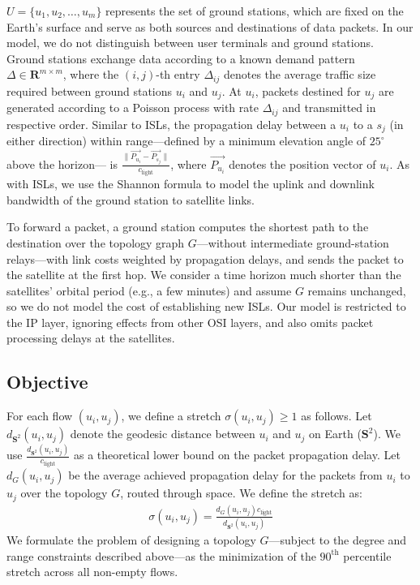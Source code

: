 \documentclass[acmsmall, screen]{acmart}
\begin{document}
$U = \{ u_1, u_2, \ldots, u_{m} \}$ represents the set of ground stations, which are fixed on the Earth’s surface and serve as both sources and destinations of data packets. In our model, we do not distinguish between user terminals and ground stations. Ground stations exchange data according to a known demand pattern $\Delta \in \mathbf{R}^{m \times m}$, where the $(i,j)$-th entry $\Delta_{ij}$ denotes the average traffic size required between ground stations $u_i$ and $u_j$. At $u_i$, packets destined for $u_j$ are generated according to a Poisson process with rate $\Delta_{ij}$ and transmitted in respective order. Similar to ISLs, the propagation delay between a $u_i$ to a $s_j$ (in either direction) within range—defined by a minimum elevation angle of $25^\circ$ above the horizon— is $\frac{\|\vec{P_{u_i}} - \vec{P_{s_j}}\|}{c_\mathrm{light}}$, where $\vec{P_{u_i}}$ denotes the position vector of $u_i$. As with ISLs, we use the Shannon formula to model the uplink and downlink bandwidth of the ground station to satellite links.

To forward a packet, a ground station computes the shortest path to the destination over the topology graph 
$G$—without intermediate ground-station relays—with link costs weighted by propagation delays, and sends the packet to the satellite at the first hop. We consider a time horizon much shorter than the satellites’ orbital period (e.g., a few minutes) and assume $G$ remains unchanged, so we do not model the cost of establishing new ISLs. Our model is restricted to the IP layer, ignoring effects from other OSI layers, and also omits packet processing delays at the satellites.

\subsection{Objective}

For each flow $(u_i,u_j)$, we define a stretch $\sigma(u_i, u_j) \geq 1$ as follows. Let $d_{\mathbf{S}^2}(u_i,u_j)$ denote the geodesic distance between $u_i$ and $u_j$ on Earth ($\mathbf{S}^2$). We use $\frac{d_{\mathbf{S}^2}(u_i,u_j)}{c_\mathrm{light}}$ as a theoretical lower bound on the packet propagation delay. Let $d_G(u_i, u_j)$ be the average achieved propagation delay for the packets from $u_i$ to $u_j$ over the topology $G$, routed through space. We define the stretch as:
\begin{align}
\sigma(u_i, u_j) = \frac{d_G(u_i, u_j) c_\mathrm{light}}{d_{\mathbf{S}^2}(u_i,u_j)}
\end{align}
We formulate the problem of designing a topology $G$---subject to the degree and range constraints described above---as the minimization of the $90^{\text{th}}$ percentile stretch across all non-empty flows.
\end{document}
